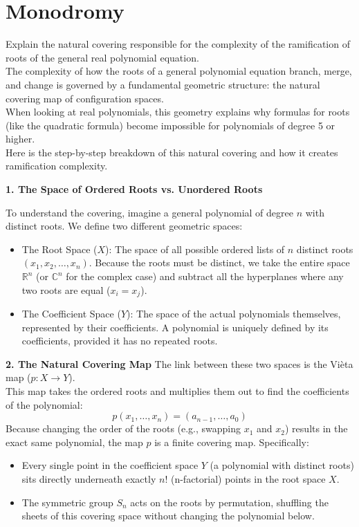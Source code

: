 \section{Monodromy}
Explain the natural covering responsible for the complexity of the ramification of roots of the general real polynomial equation.\\

The complexity of how the roots of a general polynomial equation branch, merge, and change is governed by a fundamental geometric structure: the natural covering map of configuration spaces.\\

When looking at real polynomials, this geometry explains why formulas for roots (like the quadratic formula) become impossible for polynomials of degree 5 or higher.\\

Here is the step-by-step breakdown of this natural covering and how it creates ramification complexity.

{\bf 1. The Space of Ordered Roots vs. Unordered Roots}

To understand the covering, imagine a general polynomial of degree \(n\) with distinct roots. 
We define two different geometric spaces: 
\begin{itemize}
\item[]The Root Space (\(X\)): The space of all possible ordered lists of \(n\) distinct roots \((x_1, x_2, \dots, x_n)\). 
Because the roots must be distinct, we take the entire space \(\mathbb{R}^{n}\) (or \(\mathbb{C}^{n}\) for the complex case) and subtract 
all the hyperplanes where any two roots are equal (\(x_i = x_j\)).
\item[] The Coefficient Space (\(Y\)): The space of the actual polynomials themselves, represented by their coefficients. 
A polynomial is uniquely defined by its coefficients, provided it has no repeated roots.
\end{itemize}

{\bf 2. The Natural Covering Map}
The link between these two spaces is the Vi\`eta map (\(p: X \to Y\)).\\

This map takes the ordered roots and multiplies them out to find the coefficients of the polynomial:
\[p(x_{1},\dots ,x_{n})=(a_{n-1},\dots ,a_{0})\]
Because changing the order of the roots (e.g., swapping \(x_{1}\) and \(x_{2}\)) results in the exact same polynomial, the map \(p\) is a finite covering map.  Specifically:
\begin{itemize}
\item[]Every single point in the coefficient space \(Y\) (a polynomial with distinct roots) sits directly underneath exactly \(n!\) (n-factorial) points in the root space \(X\).
\item[]The symmetric group \(S_{n}\) acts on the roots by permutation, shuffling the sheets of this covering space without changing the polynomial below.\\
\end{itemize}

